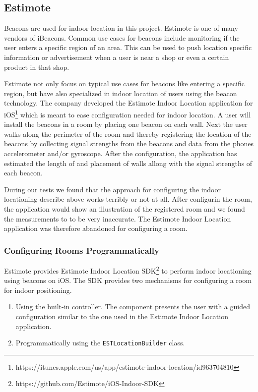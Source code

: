 \subsection{Estimote}

Beacons are used for indoor location in this project. Estimote is one of many vendors of iBeacons. Common use cases for beacons include monitoring if the user enters a specific region of an area. This can be used to push location specific information or advertisement when a user is near a shop or even a certain product in that shop.

Estimote not only focus on typical use cases for beacons like entering a specific region, but have also specialized in indoor location of users using the beacon technology. The company developed the Estimote Indoor Location application for iOS\footnote{https://itunes.apple.com/us/app/estimote-indoor-location/id963704810} which is meant to ease configuration needed for indoor location. A user will install the beacons in a room by placing one beacon on each wall. Next the user walks along the perimeter of the room and thereby registering the location of the beacons by collecting signal strengths from the beacons and data from the phones accelerometer and/or gyroscope.
After the configuration, the application has estimated the length of and placement of walls allong with the signal strengths of each beacon.

During our tests we found that the approach for configuring the indoor locationing describe above works terribly or not at all. After configurin the room, the application would show an illustration of the registered room and we found the measurements to to be very inaccurate. The Estimote Indoor Location application was therefore abandoned for configuring a room.

\subsubsection{Configuring Rooms Programmatically}

Estimote provides Estimote Indoor Location SDK\footnote{https://github.com/Estimote/iOS-Indoor-SDK} to perform indoor locationing using beacons on iOS. The SDK provides two mechanisms for configuring a room for indoor positioning.

\begin{enumerate}
\item Using the built-in controller. The component presents the user with a guided configuration similar to the one used in the Estimote Indoor Location application.
\item Programmatically using the \texttt{ESTLocationBuilder} class.
\end{enumerate}

